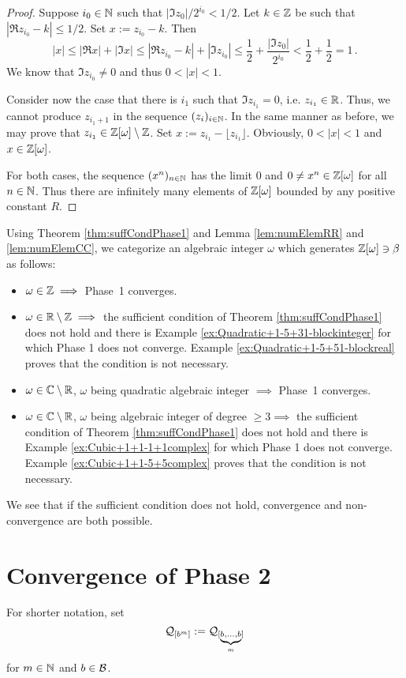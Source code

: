 \begin{proof}
Suppose $i_0\in\mathbb{N}$ such that $|\Im z_0|/2^{i_0}< 1/2$. Let $k\in\mathbb{Z}$ be such that $|\Re z_{i_0} -k|\leq 1/2$. Set $x:= z_{i_0}-k$. Then
$$
|x|\leq |\Re x| +|\Im x| \leq  |\Re z_{i_0} -k| + |\Im z_{i_0}| \leq \frac{1}{2} + \frac{|\Im z_0|}{2^{i_0}} < \frac{1}{2} +\frac{1}{2}=1\,.
$$
We know that $\Im z_{i_0} \neq 0$ and thus $0<|x|<1$.

Consider now the case that there is ${i_1}$ such that $\Im z_{i_1} = 0$, i.e. $z_{i_1}\in\mathbb{R}$. Thus, we cannot produce $z_{i_1+1}$  in the sequence $(z_i)_{i\in\mathbb{N}}$. In the same manner as before, we may prove that  $z_{i_1} \in \mathbb{Z}[\omega]\setminus \mathbb{Z}$. Set $x:= z_{i_1}- \lfloor z_{i_1} \rfloor$. Obviously, $0<|x|<1$ and $x\in\mathbb{Z}[\omega]$.

For both cases, the sequence $(x^n)_{n\in\mathbb{N}}$ has the limit 0 and $0\neq x^n\in\mathbb{Z}[\omega]$ for all $n\in\mathbb{N}$. Thus there are infinitely many elements of $\mathbb{Z}[\omega]$ bounded by any positive constant $R$. 
\end{proof}


Using Theorem \ref{thm:suffCondPhase1} and Lemma \ref{lem:numElemRR} and \ref{lem:numElemCC}, we categorize an algebraic integer $\omega$ which generates $\mathbb{Z}[\omega] \ni \beta$ as follows:

\begin{itemize}
    \item $\omega \in \mathbb{Z} \implies$ Phase~1 converges.
    \item $\omega \in \mathbb{R}\setminus\mathbb{Z} \implies$ the sufficient condition of Theorem \ref{thm:suffCondPhase1} does not hold and there is  Example \ref{ex:Quadratic+1-5+31-blockinteger} for which Phase 1 does not converge.  Example \ref{ex:Quadratic+1-5+51-blockreal} proves that the condition is not necessary.
    \item $\omega \in \mathbb{C}\setminus\mathbb{R}$, $\omega$ being quadratic algebraic integer $\implies$ Phase~1 converges.
    \item $\omega \in \mathbb{C}\setminus\mathbb{R}$, $\omega$ being algebraic integer of degree $\geq 3 \implies$ the sufficient condition  of Theorem \ref{thm:suffCondPhase1} does not hold and there is  Example \ref{ex:Cubic+1+1-1+1complex} for which Phase 1 does not converge. Example \ref{ex:Cubic+1+1-5+5complex} proves that the condition is not necessary.
\end{itemize}
We see that if the sufficient condition does not hold, convergence and non-convergence are both possible.


\newpage
\section{Convergence of Phase 2}
\label{sec:convergencePhase2}
For shorter notation, set 
$$
\mathcal{Q}_{[b^{m}]}:=\mathcal{Q}_{[\underbrace{\scriptstyle b,\dots,b}_m]}
$$ for $m \in \mathbb{N}$ and $b\in\mathcal{B}$.

